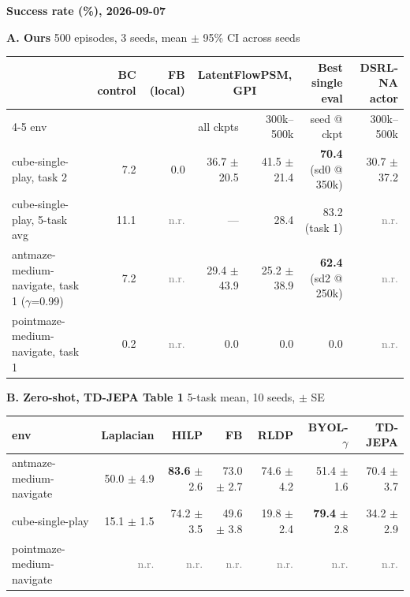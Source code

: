 \documentclass[10pt]{article}
\newcommand{\nr}{\textcolor{gray}{n.r.}}
\begin{document}
\pagestyle{empty}
\begin{center}{\large\bfseries Success rate (\%), 2026-09-07}\end{center}

\noindent\textbf{A. Ours} \hfill {\small 500 episodes, 3 seeds, mean $\pm$ 95\% CI across seeds}
\begin{center}\small
\begin{tabular}{l r r r r r r}
\toprule
 & BC control & FB (local) & \multicolumn{2}{c}{LatentFlowPSM, GPI} & Best single eval & DSRL-NA actor \\
\cmidrule(lr){4-5}
env & & & all ckpts & 300k--500k & seed @ ckpt & 300k--500k \\
\midrule
cube-single-play, task 2   & 7.2  & 0.0 & 36.7 $\pm$ 20.5 & 41.5 $\pm$ 21.4 & \textbf{70.4} (sd0 @ 350k) & 30.7 $\pm$ 37.2 \\
cube-single-play, 5-task avg & 11.1 & \nr & --- & 28.4 & 83.2 (task 1) & \nr \\
antmaze-medium-navigate, task 1 ($\gamma$=0.99) & 7.2 & \nr & 29.4 $\pm$ 43.9 & 25.2 $\pm$ 38.9 & \textbf{62.4} (sd2 @ 250k) & \nr \\
pointmaze-medium-navigate, task 1 & 0.2 & \nr & 0.0 & 0.0 & 0.0 & \nr \\
\bottomrule
\end{tabular}
\end{center}

\vspace{8pt}
\noindent\textbf{B. Zero-shot, TD-JEPA Table 1} \hfill {\small 5-task mean, 10 seeds, $\pm$ SE}
\begin{center}\small
\begin{tabular}{l r r r r r r}
\toprule
env & Laplacian & HILP & FB & RLDP & BYOL-$\gamma$ & TD-JEPA \\
\midrule
antmaze-medium-navigate & 50.0 $\pm$ 4.9 & \textbf{83.6} $\pm$ 2.6 & 73.0 $\pm$ 2.7 & 74.6 $\pm$ 4.2 & 51.4 $\pm$ 1.6 & 70.4 $\pm$ 3.7 \\
cube-single-play        & 15.1 $\pm$ 1.5 & 74.2 $\pm$ 3.5 & 49.6 $\pm$ 3.8 & 19.8 $\pm$ 2.4 & \textbf{79.4} $\pm$ 2.8 & 34.2 $\pm$ 2.9 \\
pointmaze-medium-navigate & \nr & \nr & \nr & \nr & \nr & \nr \\
\bottomrule
\end{tabular}
\end{center}
\end{document}
